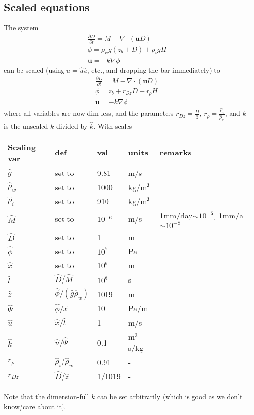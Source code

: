 \documentclass[DIV=13,halfparskip,11pt,headinclude]{scrartcl}
\begin{document}
\subsection{Scaled equations}
The system
\begin{align}
  \frac{\partial D}{\partial t} = M - \nabla \cdot (\mathbf{u} D)\\
  \phi = \rho_w g (z_b + D) + \rho_i g H\\
  \mathbf{u} = -k \nabla \phi
\end{align}
can be scaled (using $u = \hat u \bar u$, etc., and dropping the bar
immediately) to
\begin{align}
  \frac{\partial D}{\partial t} = M - \nabla \cdot (\mathbf{u} D)\\
  \phi = z_b + r_{Dz}D + r_\rho H\\
  \mathbf{u} = - k \nabla \phi
\end{align}
where all variables are now dim-less, and the parameters $r_{Dz} =
\frac{\hat{D}}{\hat z}$, $r_\rho=\frac{\hat \rho_i}{\hat \rho_w}$,
and $k$ is the unscaled $k$ divided by $\hat k$.  With
scales
\begin{center}
      \renewcommand{\arraystretch}{1.2}
  \begin{tabular}{lllll}
Scaling var & def & val & units & remarks\\
\hline
  $\hat g$ & set to & 9.81 & m/s \\
  $\hat \rho_w$  & set to & 1000 & kg/m$^3$ \\
  $\hat \rho_i$  & set to & 910 & kg/m$^3$ \\
  $\hat M$ & set to & 10$^{-6}$ & m/s & 1mm/day$\sim10^{-5}$, 1mm/a$\sim10^{-8}$\\
  $\hat D$       & set to & 1   & m \\
  $\hat \phi$ & set to & $10^7$ & Pa\\
  $\hat x$ & set to & 10$^6$ & m\\
    \hline
    $\hat t$ & $\hat D/\hat M$ & $10^6$ & s\\
    $\hat z$ & $\hat \phi/(\hat g \hat \rho_w)$ & 1019 & m \\
    $\hat \Psi$ & $\hat \phi/\hat x$ & 10 & Pa/m\\
    $\hat u$ & $\hat x / \hat t$ & 1 & m/s\\
    $\hat k$ & $\hat u / \hat\Psi$ & 0.1 & m$^3$s/kg\\
  \hline
  $r_\rho$ & $\hat \rho_i/\hat \rho_w$ & 0.91 & -\\
  $r_{Dz}$ & $\hat D/\hat z$ & 1/1019 & -\\
\end{tabular}
\end{center}
Note that the dimension-full $k$ can be set arbitrarily (which is good
as we don't know/care about it).
\end{document}
